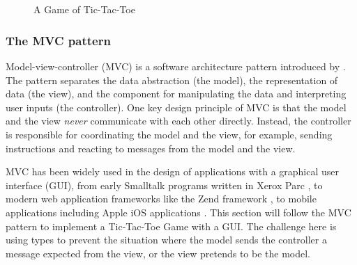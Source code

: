 \begin{figure}[p]
\begin{center}
{        }\\                
        \\                        
    \end{center}
     \caption{A Game of Tic-Tac-Toe}
   \label{tictactoe_example}
\end{figure}


\subsubsection{The MVC pattern}

Model-view-controller (MVC) is a software architecture pattern introduced by 
\citet{reenskaug1979original}.  The pattern separates the data abstraction
(the model), the representation of data (the view), and the component for 
manipulating the data and interpreting user inputs (the controller).  
One key design principle of MVC is that the model and the view {\it never} 
communicate with each other directly.  Instead, the controller is responsible 
for coordinating the model and the view, for example,  sending instructions and 
reacting to messages from the model and the view.  

MVC has been widely used in the design of applications with a graphical user 
interface (GUI), from early Smalltalk programs written in Xerox Parc 
\citep{reenskaug1979original, reenskaug2003model}, to modern web application 
frameworks like the Zend framework \citep{allen2009zend}, to mobile 
applications including Apple iOS applications \citep{apple:objc}.  This 
section will follow the MVC pattern to implement a Tic-Tac-Toe Game with a 
GUI.  The challenge here is using types to prevent the 
situation where the model sends the controller a message expected from the 
view, or the view pretends to be the model. 
 


